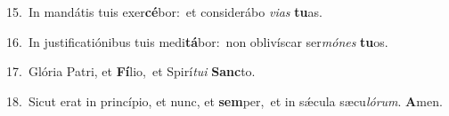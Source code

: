 {\numbfont\textcolor{\numbcolor}{15.}}~In mandátis tuis exer\-\textbf{cé}\-bor:~\star et considerábo \textit{vi}\-\textit{as} \textbf{tu}\-as.\par
{\numbfont\textcolor{\numbcolor}{16.}}~In justificatiónibus tuis medi\-\textbf{tá}\-bor:~\star non oblivíscar ser\-\textit{mó}\-\textit{nes} \textbf{tu}\-os.\par
{\numbfont\textcolor{\numbcolor}{17.}}~Glória Patri, et \textbf{Fí}\-lio,~\star et Spirí\-\textit{tu}\-\textit{i} \textbf{Sanc}\-to.\par
{\numbfont\textcolor{\numbcolor}{18.}}~Sicut erat in princípio, et nunc, et \textbf{sem}\-per,~\star et in sǽcula sæcu\-\textit{ló}\-\textit{rum}. \textbf{A}\-men.\par
